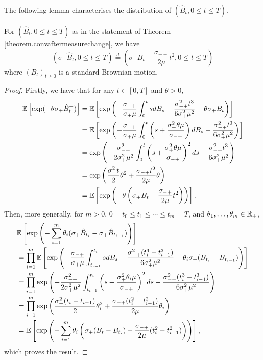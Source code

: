  The following lemma characterises the distribution of $(\hat{B}_t, {0\leq t\leq T})$.
 \begin{lemma}\label{lemma.characterizelimitprocess}
 For $(\hat{B}_t, {0\leq t\leq T})$ as in the statement of Theorem \ref{theorem.convaftermeasurechange}, we have  
 $$(\sigma_+ \hat{B}_t, {0\leq t\leq T})\overset{d}{=}\left(\sigma_+ B_t-\frac{\sigma_{-+}}{2\mu}t^2, {0\leq t\leq T}\right)$$
 where $(B_t)_{t\geq 0}$ is a standard Brownian motion.
 \end{lemma}
 \begin{proof}
 Firstly, we have that for any $t\in [0,T]$ and $\theta>0$,
 \begin{align*} {\mathbb E}\left[\exp(-\theta \sigma_+ \hat{B}_t^+)\right] &= {\mathbb E} \left[ \exp\left(-\frac{\sigma_{-+}}{\sigma_+ \mu}\int_0^t s dB_s-\frac{\sigma_{-+}^2 t^3}{6\sigma_+^2\mu^2}-\theta\sigma_+ B_t  \right)\right]\\
 &={\mathbb E}\left[\exp \left( -\frac{\sigma_{-+}}{\sigma_+ \mu}\int_0^t \left(s+\frac{\sigma_+^2\theta \mu}{\sigma_{-+}}\right) dB_s -\frac{\sigma_{-+}^2 t^3}{6\sigma_+^2\mu^2}\right)\right] \\
 &= \exp\left(-\frac{\sigma_{-+}^2}{2\sigma_+^2 \mu^2}\int_0^t \left(s+\frac{\sigma_+^2\theta \mu}{\sigma_{-+}}\right)^2 ds -\frac{\sigma_{-+}^2 t^3}{6\sigma_+^2\mu^2}\right)\\
 &=\exp\left(\frac{\sigma_+^2 t}{2}\theta^2+\frac{\sigma_{-+} t^2}{2\mu}\theta \right)\\
 &= {\mathbb E} \left[\exp\left(-\theta\left(\sigma_+ B_t - \frac{\sigma_{-+}}{2\mu} t^2\right)\right)\right].
 \end{align*}
 Then, more generally, for $m>0$, $0=t_0\leq t_1\leq \cdots \leq t_m=T$, and $\theta_1, \dots, \theta_m \in {\mathbb R}_+$, 
 \begin{align*}
     &{\mathbb E}\left[\exp\left(-\sum_{i=1}^m \theta_i(\sigma_+\hat{B}_{t_i}-\sigma_+\hat{B}_{t_{i-1}})\right)\right]\\
     &= \prod_{i=1}^m {\mathbb E}\left[\exp\left(-\frac{\sigma_{-+}}{\sigma_+\mu} \int _{t_{i-1}}^{t_i} s dB_s-\frac{\sigma_{-+}^2 (t_i^3-t_{i-1}^3)}{6\sigma_+^2 \mu^2}-\theta_i \sigma_+  (B_{t_i}-B_{t_{i-1}})\right)\right]\\
     &= \prod_{i=1}^m  \exp\left( -\frac{\sigma_{-+}^2}{2\sigma_+^2 \mu^2}\int_{t_{i-1}}^{t_i}\left(s+\frac{\sigma_+^2\theta_i\mu}{\sigma_{-+}}\right)^2 ds - \frac{\sigma_{-+}^2 (t_i^3-t_{i-1}^3)}{6\sigma_+^2 \mu^2} \right)\\
     &=  \prod_{i=1}^m \exp\left(\frac{ \sigma_+^2 (t_i-t_{i-1}) }{2}\theta_i^2+\frac{\sigma_{-+} (t_i^2-t_{i-1}^2)}{2\mu}\theta_i \right)\\
     &={\mathbb E} \left[\exp\left(-\sum_{i=1}^m\theta_i\left(\sigma_+ (B_t-B_{t_i}) - \frac{\sigma_{-+}}{2\mu} (t_i^2-t_{i-1}^2)\right)\right)\right],
 \end{align*}
 which proves the result.
 \end{proof}

